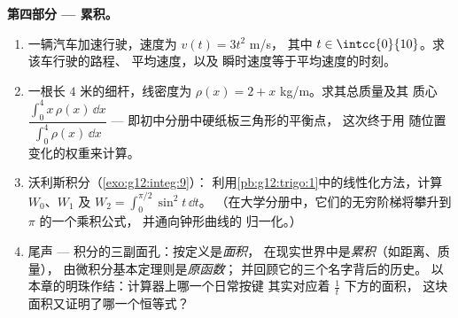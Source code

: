 \begin{problem}
\medskip
\noindent\textbf{第四部分 --- 累积。}
\begin{enumerate}[resume]
  \item 一辆汽车加速行驶，速度为 $v(t) = 3t^2$ m/s，
        其中 $t \in \intcc{0}{10}$。求该车行驶的路程、
        平均速度，以及
        瞬时速度等于平均速度的时刻。
  \item 一根长 $4$ 米的细杆，线密度为
        $\rho(x) = 2 + x$ kg/m。求其总质量及其
        质心
        $\dfrac{\int_0^4 x\,\rho(x)\,\dd x}{\int_0^4
        \rho(x)\,\dd x}$ --- 即初中分册中硬纸板三角形的平衡点，
        这次终于用
        随位置变化的权重来计算。
  \item 沃利斯积分（\cref{exo:g12:integ:9}）：
        利用\cref{pb:g12:trigo:1}中的线性化方法，计算 $W_0$、$W_1$ 及
        $W_2 = \int_0^{\pi/2} \sin^2 t\,\dd t$。
        （在大学分册中，它们的无穷阶梯将攀升到
        $\pi$ 的一个乘积公式，
        并通向钟形曲线的
        归一化。）
  \item 尾声 --- 积分的三副面孔：按定义是\emph{面积}，
        在现实世界中是\emph{累积}（如距离、质量），
        由微积分基本定理则是\emph{原函数}；
        并回顾它的三个名字背后的历史。
        以本章的明珠作结：计算器上哪一个日常按键
        其实对应着 $\frac1t$ 下方的面积，
        这块面积又证明了哪一个恒等式？
\end{enumerate}
\end{problem}
